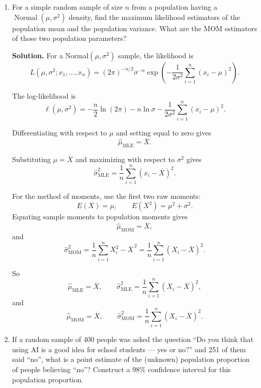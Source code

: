 \documentclass[12pt]{article}
\begin{document}
\begin{enumerate}[label=(\arabic*), leftmargin=*]
For the method of moments, since the population mean is $\mu$, equating it to the sample mean gives
\[
\hat{\mu}_{\mathrm{MOM}}=\overline{X}.
\]

Therefore
\[
\boxed{\hat{\mu}_{\mathrm{MLE}}=\overline{X}},
\qquad
\boxed{\hat{\mu}_{\mathrm{MOM}}=\overline{X}}.
\]

\item For a simple random sample of size $n$ from a population having a $\operatorname{Normal}(\mu,\sigma^2)$ density, find the maximum likelihood estimators of the population mean and the population variance. What are the MOM estimators of those two population parameters?

\par\medskip
\noindent\textbf{Solution.}
For a Normal$(\mu,\sigma^2)$ sample, the likelihood is
\[
L(\mu,\sigma^2;x_1,\ldots,x_n)
=(2\pi)^{-n/2}\sigma^{-n}
\exp\!\left(-\frac{1}{2\sigma^2}\sum_{i=1}^n (x_i-\mu)^2\right).
\]

The log-likelihood is
\[
\ell(\mu,\sigma^2)
=-\frac n2\ln(2\pi)-n\ln\sigma-\frac{1}{2\sigma^2}\sum_{i=1}^n (x_i-\mu)^2.
\]

Differentiating with respect to $\mu$ and setting equal to zero gives
\[
\hat{\mu}_{\mathrm{MLE}}=\overline{X}.
\]

Substituting $\mu=\overline{X}$ and maximizing with respect to $\sigma^2$ gives
\[
\hat{\sigma}^2_{\mathrm{MLE}}=\frac1n\sum_{i=1}^n (x_i-\overline{X})^2.
\]

For the method of moments, use the first two raw moments:
\[
E(X)=\mu,
\qquad
E(X^2)=\mu^2+\sigma^2.
\]
Equating sample moments to population moments gives
\[
\hat{\mu}_{\mathrm{MOM}}=\overline{X},
\]
and
\[
\hat{\sigma}^2_{\mathrm{MOM}}
=\frac1n\sum_{i=1}^n X_i^2-\overline{X}^{\,2}
=\frac1n\sum_{i=1}^n (X_i-\overline{X})^2.
\]

So
\[
\boxed{\hat{\mu}_{\mathrm{MLE}}=\overline{X}},\qquad
\boxed{\hat{\sigma}^2_{\mathrm{MLE}}=\frac1n\sum_{i=1}^n (X_i-\overline{X})^2},
\]
and
\[
\boxed{\hat{\mu}_{\mathrm{MOM}}=\overline{X}},\qquad
\boxed{\hat{\sigma}^2_{\mathrm{MOM}}=\frac1n\sum_{i=1}^n (X_i-\overline{X})^2}.
\]

\item If a random sample of 400 people was asked the question ``Do you think that using AI is a good idea for school students --- yes or no?'' and 251 of them said ``no'', what is a point estimate of the (unknown) population proportion of people believing ``no''? Construct a 98\% confidence interval for this population proportion.


\end{enumerate}
\end{document}
